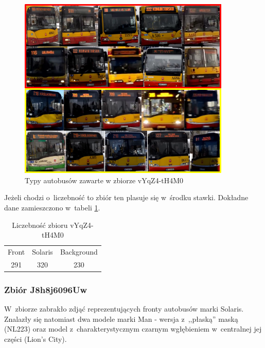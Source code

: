 \begin{figure}[!h]
    \centering
    \includegraphics[width=0.9\textwidth]{img/exp_trainig_data_vYq}
    \caption{Typy autobusów zawarte w zbiorze vYqZ4-tH4M0}
    \label{fig:vYqZ4-tH4M0_types}
\end{figure}

Jeżeli chodzi o~liczebność to zbiór ten plasuje się w~środku stawki.
Dokładne dane zamieszczono w~tabeli \ref{tab:vYqZ4-tH4M0_count}.

\begin{table}[!h]
    \centering
    \begin{tabular}{c|c|c}
        Front   & Solaris   & Background \\
        291     & 320       & 230 
    \end{tabular}
    \caption{Liczebność zbioru vYqZ4-tH4M0}
    \label{tab:vYqZ4-tH4M0_count}
\end{table}

\newpage

\subsubsection{Zbiór J8h8j6096Uw}

W~zbiorze zabrakło zdjąć reprezentujących fronty autobusów marki
Solaris. Znalazły się natomiast dwa modele marki Man - wersja 
z~,,płaską'' maską (NL223) oraz model z~charakterystycznym czarnym
wgłębieniem w~centralnej jej części (Lion's City).

